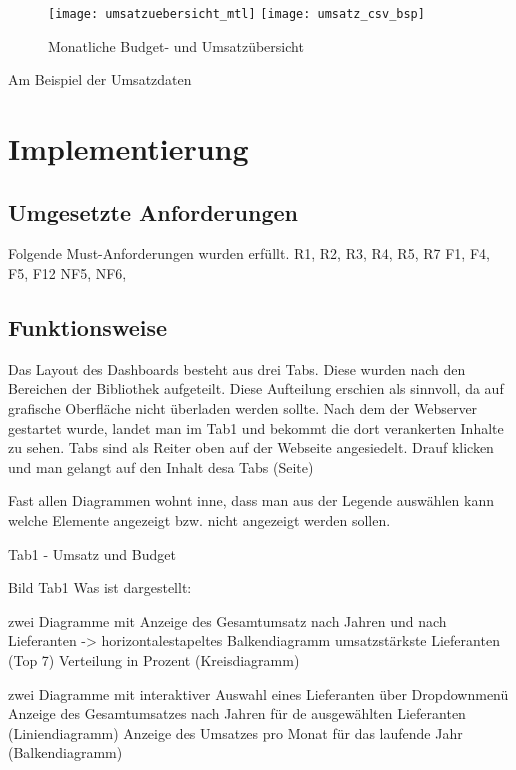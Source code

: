     \begin{figure}[h]
        \centering
            \texttt{[image: umsatzuebersicht\_mtl]}
            \texttt{[image: umsatz\_csv\_bsp]}
            \caption{Monatliche Budget- und Umsatzübersicht}
            \label{fig:umsatzuebersicht_csv}
    \end{figure}
    

    Am Beispiel der Umsatzdaten 
    

\section{Implementierung}

  

    \subsection{Umgesetzte Anforderungen}
    Folgende Must-Anforderungen wurden erfüllt.
    R1, R2, R3, R4, R5, R7
    F1, F4, F5, F12
    NF5, NF6, 
    \subsection{Funktionsweise}
    Das Layout des Dashboards besteht aus drei Tabs. Diese wurden nach den Bereichen der Bibliothek aufgeteilt. Diese Aufteilung erschien als sinnvoll,
    da auf grafische Oberfläche nicht überladen werden sollte.
    Nach dem der Webserver gestartet wurde, landet man im Tab1 und bekommt die dort verankerten Inhalte zu sehen.
    Tabs sind als Reiter oben auf der Webseite angesiedelt.
    Drauf klicken und man gelangt auf den Inhalt desa Tabs (Seite)
    
    Fast allen Diagrammen wohnt inne, dass man aus der Legende auswählen kann welche Elemente angezeigt bzw. nicht angezeigt werden sollen.
    
    Tab1 - Umsatz und Budget
    
    Bild Tab1
    Was ist dargestellt:
    
    zwei Diagramme mit 
        Anzeige des Gesamtumsatz nach Jahren und nach Lieferanten ->  horizontalestapeltes Balkendiagramm
        umsatzstärkste Lieferanten (Top 7) Verteilung in Prozent (Kreisdiagramm)
        
    zwei Diagramme mit interaktiver Auswahl eines Lieferanten über Dropdownmenü
        Anzeige des Gesamtumsatzes nach Jahren für de ausgewählten Lieferanten (Liniendiagramm)
        Anzeige des Umsatzes pro Monat für das laufende Jahr (Balkendiagramm)
    
